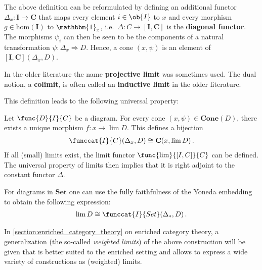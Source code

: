     \begin{adefinition}
        The above definition can be reformulated by defining an additional functor $\Delta_x:\mathbf{I}\rightarrow\mathbf{C}$ that maps every element $i\in\ob{I}$ to $x$ and every morphism $g\in\mathrm{hom}(\mathbf{I})$ to $\mathbbm{1}_x$, i.e.~$\Delta:C\rightarrow[\mathbf{I},\mathbf{C}]$ is the \textbf{diagonal functor}. The morphisms $\psi_i$ can then be seen to be the components of a natural transformation $\psi:\Delta_x\Rightarrow D$. Hence, a cone $(x,\psi)$ is an element of $[\mathbf{I},\mathbf{C}](\Delta_x,D)$.
    \end{adefinition}

    \begin{remark*}
        In the older literature the name \textbf{projective limit} was sometimes used. The dual notion, a \textbf{colimit}, is often called an \textbf{inductive limit} in the older literature.
    \end{remark*}
    This definition leads to the following universal property:
    \begin{uproperty}\label{cat:limit_uproperty}
        Let $\func{D}{I}{C}$ be a diagram. For every cone $(x,\psi)\in\mathbf{Cone}(D)$, there exists a unique morphism $f:x\rightarrow\lim D$. This defines a bijection
        \begin{gather}
            \funccat{I}{C}(\Delta_x,D)\cong\mathbf{C}(x,\lim D)\,.
        \end{gather}
        If all (small) limits exist, the limit functor $\func{\lim}{[I,C]}{C}$ can be defined. The universal property of limits then implies that it is right adjoint to the constant functor $\Delta$.

        For diagrams in $\mathbf{Set}$ one can use the fully faithfulness of the Yoneda embedding to obtain the following expression:
        \begin{gather}
            \lim D\cong\funccat{I}{Set}(\Delta_\ast,D)\,.
        \end{gather}
    \end{uproperty}
    \begin{remark}
        In \cref{section:enriched_category_theory} on enriched category theory, a generalization (the so-called \textit{weighted limits}) of the above construction will be given that is better suited to the enriched setting and allows to express a wide variety of constructions as (weighted) limits.
    \end{remark}

